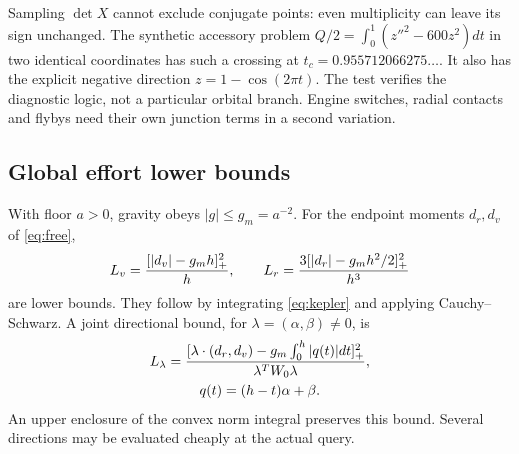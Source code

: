 Sampling $\det X$ cannot exclude conjugate points: even multiplicity
can leave its sign unchanged. The synthetic accessory problem
$Q/2=\int_0^1(z''^2-600z^2)dt$ in two identical coordinates
has such a crossing at $t_c=0.955712066275\ldots$.
It also has the explicit negative direction $z=1-\cos(2\pi t)$.
The test verifies the diagnostic logic, not a particular orbital branch.
Engine switches, radial contacts and flybys need their own junction
terms in a second variation.

\subsection{Global effort lower bounds}
With floor $a>0$, gravity obeys $|g|\le g_m=a^{-2}$.
For the endpoint moments $d_r,d_v$ of \eqref{eq:free},
\begin{equation}
 L_v=\frac{[|d_v|-g_mh]_+^2}{h},\qquad
 L_r=\frac{3[|d_r|-g_mh^2/2]_+^2}{h^3}
 \label{eq:momentbounds}
\end{equation}
are lower bounds. They follow by integrating \eqref{eq:kepler}
and applying Cauchy--Schwarz.
A joint directional bound, for $\lambda=(\alpha,\beta)\ne0$, is
\begin{equation}
 \begin{gathered}
 L_\lambda=
 \frac{[\lambda\cdot(d_r,d_v)-g_m\int_0^h|q(t)|dt]_+^2}
 {\lambda^TW_0\lambda},\\
 q(t)=(h-t)\alpha+\beta.
 \end{gathered}
\end{equation}
An upper enclosure of the convex norm integral preserves this bound.
Several directions may be evaluated cheaply at the actual query.

